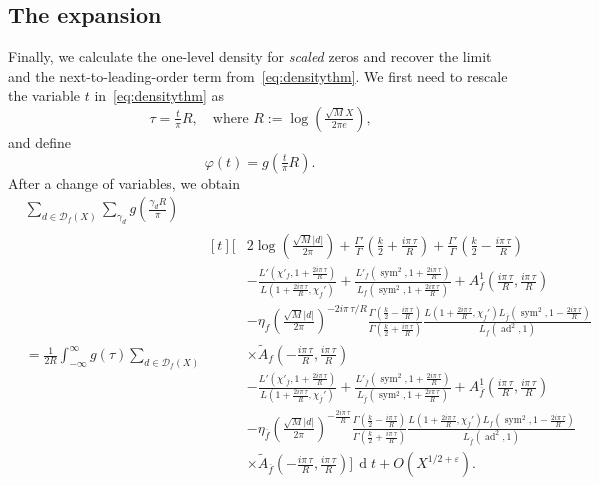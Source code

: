 \documentclass[11pt,reqno]{amsart} \usepackage{fullpage}
\newcommand{\vep}{\varepsilon}
\renewcommand{\d}[1]{\,\operatorname*{d}\!{#1}}
\newcommand\be{\begin{equation}}
\newcommand\ee{\end{equation}}
\newcommand{\Lchi}[2][]{L(#2,\chi_f#1)}
\newcommand{\Lchibar}[2][]{L\left(#2,\chi_{\overline f}#1\right)}
\DeclareMathOperator{\sym}{sym}
\DeclareMathOperator{\ad}{ad}
\newcommand{\D}{\mathcal D_f}
\numberwithin{equation}{section}
\begin{document}
\subsection{The expansion}
Finally, we calculate the one-level density for \emph{scaled} zeros and recover the
limit and the next-to-leading-order term from~\eqref{eq:densitythm}. We first
need to rescale the variable $t$ in~\eqref{eq:densitythm} as
\be\label{eq:Rdef} \tau = \tfrac t \pi R,
\quad\text{where $R:=\log \left(\tfrac{\sqrt M X}{2\pi e}\right)$,} \ee
and define
\be\label{eq:gdef} \varphi(t)= g\left(\tfrac t \pi R\right).\ee
After a change of variables, we obtain
\be\label{eq:normalizeddensity}\begin{aligned}
  &\sum_{d\in\D(X)}
  \sum_{\gamma_d}g\left(\frac{\gamma_d R}\pi\right) \\
  &=\frac1{2R}\int_{-\infty}^\infty g(\tau)
  \sum_{d\in\D(X)}
  \begin{aligned}[t]\Bigg[
    &2\log\left(\frac{\sqrt M|d|}{2\pi}\right)
    +\frac{\Gamma'}{\Gamma}\left(\frac k2+\frac{i\pi\,\tau}{R}\right)
    +\frac{\Gamma'}{\Gamma}\left(\frac k2-\frac{i\pi\,\tau}{R}\right) \\
    &-\frac{L'\left(\chi'_f,1+\frac{2i\pi\,\tau}{R}\right)}
    {\Lchi[']{1+\frac{2i\pi\,\tau}{R}}}
    +\frac{L'_f\left(\sym^2,1+\frac{2i\pi\,\tau}{R}\right)}
    {L_f\left(\sym^2,1+\frac{2i\pi\,\tau}{R}\right)}
    +A_f^1\left(\frac{i\pi\,\tau}{R},\frac{i\pi\,\tau}{R}\right) \\
    &-\eta_f\left(\frac{\sqrt M |d|}{2\pi}\right)^{-2i\pi\,\tau/R}
    \frac{\Gamma\left(\frac k2-\frac{i\pi\,\tau}{R}\right)}
    {\Gamma\left(\frac k2+\frac{i\pi\,\tau}{R}\right)}
    \frac{\Lchi[']{1+\frac{2i\pi\,\tau}{R}}
      L_{\overline f}\left(\sym^2,1-\frac{2i\pi\,\tau}{R}\right)}{L_f(\ad^2,1)} \\
    &\times\tilde{A}_f\left(-\frac{i\pi\,\tau}{R},\frac{i\pi\,\tau}{R}\right) \\
    &-\frac{L'\left(\chi'_{\overline f},1+\frac{2i\pi\,\tau}{R}\right)}
    {\Lchibar[']{1+\frac{2i\pi\,\tau}{R}}}
    +\frac{L'_{\overline f}\left(\sym^2,1+\frac{2i\pi\,\tau}{R}\right)}
    {L_{\overline f}\left(\sym^2,1+\frac{2i\pi\,\tau}{R}\right)}
    +A_{\overline f}^1\left(\frac{i\pi\,\tau}{R},\frac{i\pi\,\tau}{R}\right)\\
    &-\eta_{\overline f}\left(\frac{\sqrt M |d|}{2\pi}\right)^{-\frac{2i\pi\,\tau}{R}}
    \frac{\Gamma\left(\frac k2-\frac{i\pi\,\tau}{R}\right)}{\Gamma\left(\frac k2+\frac{i\pi\,\tau}{R}\right)}
    \frac{\Lchibar[']{1+\frac{2i\pi\,\tau}{R}}
      L_f\left(\sym^2,1-\frac{2i\pi\,\tau}{R}\right)}
    {L_{\overline f}(\ad^2,1)} \\
    &\times\tilde{A}_{\overline f}\left(-\frac{i\pi\,\tau}{R},\frac{i\pi\,\tau}{R}\right)
    \Bigg]\d t
    +O(X^{1/2+\vep}).\end{aligned}
\end{aligned}\ee
\end{document}

